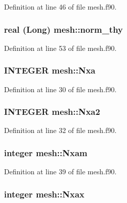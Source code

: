 Definition at line 46 of file mesh.f90.

\hypertarget{namespacemesh_a753aba092294fa8bffbee1fc1b099584}{
\subsubsection[{norm\_\-thy}]{\setlength{\rightskip}{0pt plus 5cm}real (Long) {\bf mesh::norm\_\-thy}}}
\label{namespacemesh_a753aba092294fa8bffbee1fc1b099584}


Definition at line 53 of file mesh.f90.

\hypertarget{namespacemesh_ae1fae2c81e5dc8a2e00f92d4ccb24444}{
\subsubsection[{Nxa}]{\setlength{\rightskip}{0pt plus 5cm}INTEGER {\bf mesh::Nxa}}}
\label{namespacemesh_ae1fae2c81e5dc8a2e00f92d4ccb24444}


Definition at line 30 of file mesh.f90.

\hypertarget{namespacemesh_a632597390bacfaae4c10d8cb907b2aec}{
\subsubsection[{Nxa2}]{\setlength{\rightskip}{0pt plus 5cm}INTEGER {\bf mesh::Nxa2}}}
\label{namespacemesh_a632597390bacfaae4c10d8cb907b2aec}


Definition at line 32 of file mesh.f90.

\hypertarget{namespacemesh_abe9e186636ba22271b7b4550522dceaf}{
\subsubsection[{Nxam}]{\setlength{\rightskip}{0pt plus 5cm}integer {\bf mesh::Nxam}}}
\label{namespacemesh_abe9e186636ba22271b7b4550522dceaf}


Definition at line 39 of file mesh.f90.

\hypertarget{namespacemesh_a258a6753e659f5aad4d77626f82c674c}{
\subsubsection[{Nxax}]{\setlength{\rightskip}{0pt plus 5cm}integer {\bf mesh::Nxax}}}
\label{namespacemesh_a258a6753e659f5aad4d77626f82c674c}



